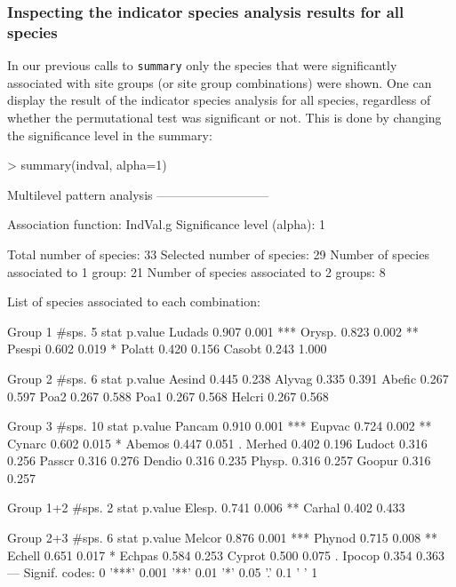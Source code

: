 \documentclass[11pt,a4paper]{article}
\begin{document}
\subsubsection{Inspecting the indicator species analysis results for all species}
In our previous calls to \texttt{summary} only the species that were significantly associated with site groups (or site group combinations) were shown. One can display the result of the indicator species analysis for all species, regardless of whether the permutational test was significant or not. This is done by changing the significance level in the summary:
\begin{Schunk}
\begin{Sinput}
> summary(indval, alpha=1)
\end{Sinput}
\begin{Soutput}
 Multilevel pattern analysis
 ---------------------------

 Association function: IndVal.g
 Significance level (alpha): 1

 Total number of species: 33
 Selected number of species: 29 
 Number of species associated to 1 group: 21 
 Number of species associated to 2 groups: 8 

 List of species associated to each combination: 

 Group 1  #sps.  5 
        stat p.value    
Ludads 0.907   0.001 ***
Orysp. 0.823   0.002 ** 
Psespi 0.602   0.019 *  
Polatt 0.420   0.156    
Casobt 0.243   1.000    

 Group 2  #sps.  6 
        stat p.value
Aesind 0.445   0.238
Alyvag 0.335   0.391
Abefic 0.267   0.597
Poa2   0.267   0.588
Poa1   0.267   0.568
Helcri 0.267   0.568

 Group 3  #sps.  10 
        stat p.value    
Pancam 0.910   0.001 ***
Eupvac 0.724   0.002 ** 
Cynarc 0.602   0.015 *  
Abemos 0.447   0.051 .  
Merhed 0.402   0.196    
Ludoct 0.316   0.256    
Passcr 0.316   0.276    
Dendio 0.316   0.235    
Physp. 0.316   0.257    
Goopur 0.316   0.257    

 Group 1+2  #sps.  2 
        stat p.value   
Elesp. 0.741   0.006 **
Carhal 0.402   0.433   

 Group 2+3  #sps.  6 
        stat p.value    
Melcor 0.876   0.001 ***
Phynod 0.715   0.008 ** 
Echell 0.651   0.017 *  
Echpas 0.584   0.253    
Cyprot 0.500   0.075 .  
Ipocop 0.354   0.363    
---
Signif. codes:  0 '***' 0.001 '**' 0.01 '*' 0.05 '.' 0.1 ' ' 1 
\end{Soutput}
\end{Schunk}
\end{document}
